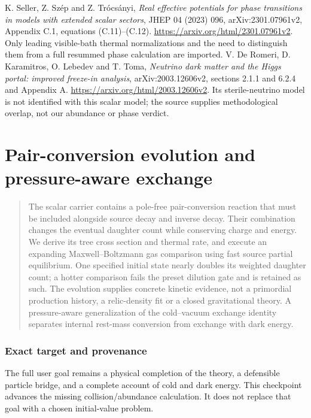 \documentclass[11pt]{article}
\begin{document}
\begin{thebibliography}{9}
 K. Seller, Z. Sz\'ep and Z. Tr\'ocs\'anyi,
\emph{Real effective potentials for phase transitions in models with extended
scalar sectors}, JHEP 04 (2023) 096, arXiv:2301.07961v2,
Appendix C.1, equations (C.11)--(C.12).
\url{https://arxiv.org/html/2301.07961v2}.
Only leading visible-bath thermal normalizations and the need to distinguish
them from a full resummed phase calculation are imported.
 V. De Romeri, D. Karamitros, O. Lebedev and T. Toma,
\emph{Neutrino dark matter and the Higgs portal: improved freeze-in analysis},
arXiv:2003.12606v2, sections 2.1.1 and 6.2.4 and Appendix A.
\url{https://arxiv.org/html/2003.12606v2}.
Its sterile-neutrino model is not identified with this scalar model;
the source supplies methodological overlap, not our abundance or phase verdict.
\end{thebibliography}

\clearpage

\part{Pair-conversion evolution and pressure-aware exchange}

\begin{abstract}
The scalar carrier contains a pole-free pair-conversion reaction that must
be included alongside source decay and inverse decay. Their combination
changes the eventual daughter count while conserving charge and energy.
We derive its tree cross section and thermal rate, and execute an expanding
Maxwell--Boltzmann gas comparison using fast source partial equilibrium.
One specified initial state nearly doubles its weighted daughter count;
a hotter comparison fails the preset dilution gate and is retained as such.
The evolution supplies concrete kinetic evidence, not a primordial production
history, a relic-density fit or a closed gravitational theory. A pressure-aware
generalization of the cold--vacuum exchange identity separates internal
rest-mass conversion from exchange with dark energy.
\end{abstract}

\section{Exact target and provenance}
The full user goal remains a physical completion of the theory, a defensible
particle bridge, and a complete account of cold and dark energy. This
checkpoint advances the missing collision/abundance calculation. It does
not replace that goal with a chosen initial-value problem.
\end{document}
